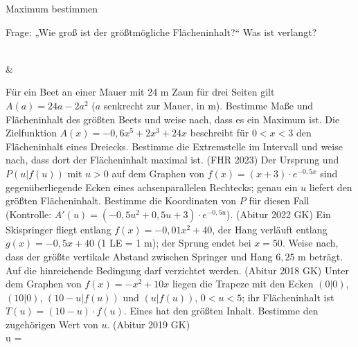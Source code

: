 \setcounter{aufgabe}{12}

\begin{aufgabe}{Maximum bestimmen}
\begin{teile}
\teil Frage: „Wie groß ist der größtmögliche Flächeninhalt?“ Was ist verlangt?  \\  \\ 
\end{teile}
\begin{gleichungsraster}[2]
 &
\end{gleichungsraster}
\begin{teile}
\teil Für ein Beet an einer Mauer mit 24 m Zaun für drei Seiten gilt $A(a) = 24a - 2a^2$ ($a$ senkrecht zur Mauer, in m). Bestimme Maße und Flächeninhalt des größten Beets und weise nach, dass es ein Maximum ist.
\teil Die Zielfunktion $A(x) = -0{,}6x^5 + 2x^3 + 24x$ beschreibt für $0 < x < 3$ den Flächeninhalt eines Dreiecks. Bestimme die Extremstelle im Intervall und weise nach, dass dort der Flächeninhalt maximal ist. \hfill (FHR 2023)
\teil Der Ursprung und $P(u | f(u))$ mit $u > 0$ auf dem Graphen von $f(x) = (x + 3) \cdot e^{-0{,}5x}$ sind gegenüberliegende Ecken eines achsenparallelen Rechtecks; genau ein $u$ liefert den größten Flächeninhalt. Bestimme die Koordinaten von $P$ für diesen Fall (Kontrolle: $A'(u) = (-0{,}5u^2 + 0{,}5u + 3) \cdot e^{-0{,}5u}$). \hfill (Abitur 2022 GK)
\teil Ein Skispringer fliegt entlang $f(x) = -0{,}01x^2 + 40$, der Hang verläuft entlang $g(x) = -0{,}5x + 40$ (1 LE = 1 m); der Sprung endet bei $x = 50$. Weise nach, dass der größte vertikale Abstand zwischen Springer und Hang $6{,}25$ m beträgt. Auf die hinreichende Bedingung darf verzichtet werden. \hfill (Abitur 2018 GK)
\teil Unter dem Graphen von $f(x) = -x^2 + 10x$ liegen die Trapeze mit den Ecken $(0 | 0)$, $(10 | 0)$, $(10 - u | f(u))$ und $(u | f(u))$, $0 < u < 5$; ihr Flächeninhalt ist $T(u) = (10 - u) \cdot f(u)$. Eines hat den größten Inhalt. Bestimme den zugehörigen Wert von $u$. \hfill (Abitur 2019 GK) \\ u = \leerfeld

\end{teile}
\end{aufgabe}

